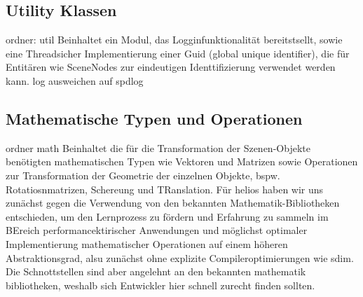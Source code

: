\subsection{Utility Klassen}
ordner: util
Beinhaltet ein Modul, das Logginfunktionalität bereitstsellt, sowie eine Threadsicher Implementierung einer Guid (global unique identifier), die für Entitären wie SceneNodes zur eindeutigen Identtifizierung verwendet werden kann. log ausweichen auf spdlog

\subsection{Mathematische Typen und Operationen}
ordner math
Beinhaltet die für die Transformation der Szenen-Objekte benötigten mathematischen Typen wie Vektoren und Matrizen sowie Operationen zur Transformation der Geometrie der einzelnen Objekte, bspw. Rotatiosnmatrizen, Schereung und TRanslation. Für helios haben wir uns zunächst gegen die Verwendung von den bekannten Mathematik-Bibliotheken entschieden, um den Lernprozess zu fördern und Erfahrung zu sammeln im BEreich performancektirischer Anwendungen und möglichst optimaler Implementierung mathematischer Operationen auf einem höheren Abstraktionsgrad, alsu zunächst ohne explizite Compileroptimierungen wie sdim.\\
Die Schnottstellen sind aber angelehnt an den bekannten mathematik bibliotheken, weshalb sich Entwickler hier schnell zurecht finden sollten.

